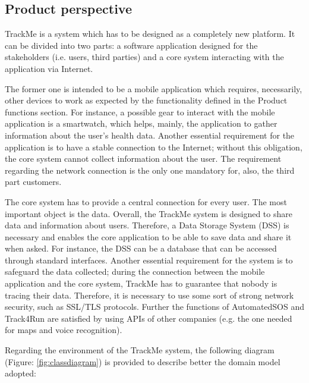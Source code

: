 \subsection{Product perspective}
TrackMe is a system which has to be designed as a completely new platform. It can be divided into 
two parts: a software application designed for the stakeholders (i.e. users, third parties) and a 
core system interacting with the application via Internet. 
\par
The former one is intended to be a mobile application which requires, necessarily, other devices to work 
as expected by the functionality defined in the Product functions section. For instance, a possible gear 
to interact with the mobile application is a smartwatch, which helps, mainly, the application to 
gather information about the user's health data. Another essential requirement for the application is to have a stable connection to the Internet; without this obligation, the core system cannot 
collect information about the user. The requirement regarding the network connection is the only one mandatory for, also, the third part customers.
\par
The core system has to provide a central connection for every user. The most important object is the data. Overall, the TrackMe system is designed to share data and 
information about users. Therefore, a Data Storage System (DSS) is necessary and enables the 
core application to be able to save data and share it when asked. For instance, the DSS can be a 
database that can be accessed through standard interfaces. Another essential 
requirement for the system is to safeguard the data collected; during the connection between the 
mobile application and the core system, TrackMe has to guarantee that nobody is tracing their data. 
Therefore, it is necessary to use some sort of strong network security, such as SSL/TLS protocols. 
Further the functions of AutomatedSOS and Track4Run are satisfied by using APIs of other companies 
(e.g. the one needed for maps and voice recognition).
\\\par
Regarding the environment of the TrackMe system, the following diagram (Figure: \ref{fig:classdiagram}) 
is provided to describe better the domain model adopted:\\

